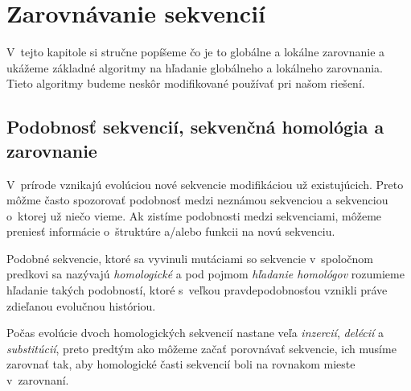 \chapter{Zarovnávanie sekvencií}

V~tejto kapitole si stručne popíšeme čo je to globálne a lokálne zarovnanie a ukážeme základné algoritmy na hľadanie globálneho a lokálneho zarovnania. Tieto algoritmy budeme neskôr modifikované používať pri našom riešení.

\section{Podobnosť sekvencií, sekvenčná homológia a zarovnanie}
V~prírode vznikajú evolúciou nové sekvencie modifikáciou už existujúcich. Preto môžme často spozorovať podobnosť medzi neznámou sekvenciou a sekvenciou o~ktorej už niečo vieme. Ak zistíme podobnosti medzi sekvenciami, môžeme preniesť informácie o~štruktúre a/alebo funkcii na novú sekvenciu.

Podobné sekvencie, ktoré sa vyvinuli mutáciami so sekvencie v~spoločnom predkovi sa nazývajú \textit{homologické} a pod pojmom \textit{hľadanie homológov} rozumieme hľadanie takých podobností, ktoré s~veľkou pravdepodobnosťou vznikli práve zdieľanou evolučnou históriou.



Počas evolúcie dvoch homologických sekvencií nastane veľa \textit{inzercií}, \textit{delécií} a \textit{substitúcií}, preto predtým ako môžeme začať porovnávať sekvencie, ich musíme zarovnať tak, aby homologické časti sekvencií boli na rovnakom mieste v~zarovnaní.
\cite{durbin, skripta}

